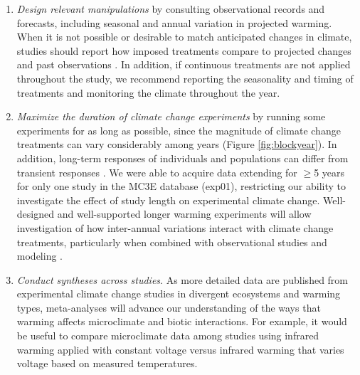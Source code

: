 \documentclass{article}
\begin{document}
\begin{enumerate}
\item\textit{Design relevant manipulations} by consulting observational records and forecasts, including seasonal and annual variation in projected warming. When it is not possible or desirable to match anticipated changes in climate, studies should report how imposed treatments compare to projected changes and past observations \citep[e.g.,][]{hoover2014, zhu2016}. In addition, if continuous treatments are not applied throughout the study, we recommend reporting the seasonality and timing of treatments and monitoring the climate throughout the year.

\item\textit{Maximize the duration of climate change experiments} by running some experiments for as long as possible, since the magnitude of climate change treatments can vary considerably among years (Figure \ref{fig:blockyear}). In addition, long-term responses of individuals and populations can differ from transient responses \citep{saleska2002,franklin1989,giasson2013,harte2015}. We were able to acquire data extending for $\geq$5 years for only one study in the MC3E database (exp01), restricting our ability to investigate the effect of study length on experimental climate change. Well-designed and well-supported longer warming experiments will allow investigation of how inter-annual variations interact with climate change treatments, particularly when combined with observational studies and modeling \citep{luo2011}.
\item\textit{Conduct syntheses across studies}. As more detailed data are published from experimental climate change studies in divergent ecosystems and warming types, meta-analyses will advance our understanding of the ways that warming affects microclimate and biotic interactions. For example, it would be useful to compare microclimate data among studies using infrared warming applied with constant voltage versus infrared warming that varies voltage based on measured temperatures. 

\end{enumerate}


\clearpage
\end{document}
